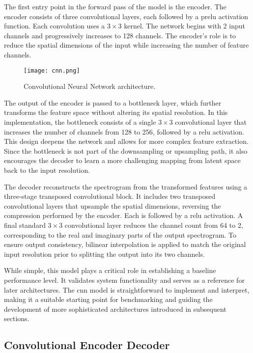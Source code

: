 The first entry point in the forward pass of the model is the encoder. The encoder consists of three convolutional layers, each followed by a \gls{prelu} activation function. Each convolution uses a \(3 \times 3\) kernel. The network begins with 2 input channels and progressively increases to 128 channels. The encoder's role is to reduce the spatial dimensions of the input while increasing the number of feature channels.

\begin{figure}[h]
    \centering
    \texttt{[image: cnn.png]}
    \caption{\label{fig:cnn}Convolutional Neural Network architecture.}
\end{figure}

The output of the encoder is passed to a bottleneck layer, which further transforms the feature space without altering its spatial resolution. In this implementation, the bottleneck consists of a single \(3 \times 3\) convolutional layer that increases the number of channels from 128 to 256, followed by a \gls{relu} activation. This design deepens the network and allows for more complex feature extraction. Since the bottleneck is not part of the downsampling or upsampling path, it also encourages the decoder to learn a more challenging mapping from latent space back to the input resolution.

The decoder reconstructs the spectrogram from the transformed features using a three-stage transposed convolutional block. It includes two transposed convolutional layers that upsample the spatial dimensions, reversing the compression performed by the encoder. Each is followed by a \gls{relu} activation. A final standard \(3 \times 3\) convolutional layer reduces the channel count from 64 to 2, corresponding to the real and imaginary parts of the output spectrogram. To ensure output consistency, bilinear interpolation is applied to match the original input resolution prior to splitting the output into its two channels.

While simple, this model plays a critical role in establishing a baseline performance level. It validates system functionality and serves as a reference for later architectures. The \gls{cnn} model is straightforward to implement and interpret, making it a suitable starting point for benchmarking and guiding the development of more sophisticated architectures introduced in subsequent sections.

\subsection{Convolutional Encoder Decoder}
\label{sec:ced}

